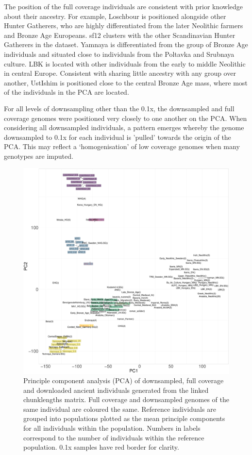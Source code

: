The position of the full coverage individuals are consistent with prior knowledge about their ancestry. For example, Loschbour is positioned alongside other Hunter Gatherers, who are highly differentiated from the later Neolithic farmers and Bronze Age Europeans. sf12 clusters with the other Scandinavian Hunter Gatherers in the dataset. Yamnaya is differentiated from the group of Bronze Age individuals and situated close to individuals from the Poltavka and Srubnaya culture. LBK is located with other individuals from the early to middle Neolithic in central Europe. Consistent with sharing little ancestry with any group over another, UstIshim is positioned close to the central Bronze Age mass, where most of the individuals in the PCA are located. 

For all levels of downsampling other than the 0.1x, the downsampled and full coverage genomes were positioned very closely to one another on the PCA. When considering all downsampled individuals, a pattern emerges whereby the genome downsampled to 0.1x for each individual is 'pulled' towards the origin of the PCA. This may reflect a `homogenisation' of low coverage genomes when many genotypes are imputed.

\begin{figure}[htp]
    \centering
    \includegraphics[width=1.0\textwidth]{../images/chapter1/PCA_panel_allInds.allCoverage.pdf}
    \caption{Principle component analysis (PCA) of downsampled, full coverage and downloaded ancient individuals generated from the linked chunklengths matrix. Full coverage and downsampled genomes of the same individual are coloured the same. Reference individuals are grouped into populations plotted as the mean principle components for all individuals within the population. Numbers in labels correspond to the number of individuals within the reference population. 0.1x samples have red border for clarity.}
    \label{fig:PCA_panel_allInds_allCoverage}
\end{figure}

